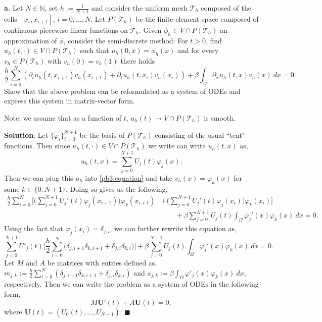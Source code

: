 \documentclass[11pt]{article}
\begin{document}
\textbf{a.} Let $N\in \mathbb{N}$, set $h := \frac{1}{N+1}$ and consider the uniform mesh $\mathcal{T}_h$ composed of the cells $[x_i,x_{i+1}]$, $i= 0,\ldots,N$.
Let $P(\mathcal{T}_h)$ be the finite element space composed of continuous piecewise linear functions on $\mathcal{T}_h$.
Given $\phi_h \in V \cap P(\mathcal{T}_h)$ an approximation of $\phi$, consider the semi-discrete method: For $t >0$, find $u_h(t, \cdot) \in V \cap P(\mathcal{T}_h)$ such that $u_h(0,x) = \phi_h(x)$ and for every $v_h \in  P(\mathcal{T}_h)$ with $v_h(0) = v_h(1)$ there holds 
\begin{equation} \label{pb3:equation}
    \frac{h}{2} \sum_{i=0}^N (\partial_t u_h (t, x_{i+1}) v_h(x_{i+1}) + \partial_t u_h(t, x_i) v_h(x_i)) + \beta \int_\Omega \partial_x u_h(t,x) v_h(x) \: dx = 0.
\end{equation}
Show that the above problem can be reformulated as a system of ODEs and express this system in matrix-vector form. 

Note: we assume that as a function of $t$, $u_h(t) \to V \cap P(\mathcal{T}_h)$ is smooth.

\vskip 1cm

\textbf{Solution}: Let $\{\varphi_i\}_{i=0}^{N+1}$ be the basis of $P(\mathcal{T}_h)$ consisting of the usual ``tent" functions.
Then since $u_h(t,\cdot) \in V \cap P(\mathcal{T}_h)$ we write can write $u_h(t,x)$ as,
\begin{equation}
    u_h(t,x) = \sum_{j=0}^{N+1} U_j(t) \varphi_j(x).
\end{equation}
Then we can plug this $u_h$ into \eqref{pb3:equation} and take $v_h(x) = \varphi_k(x)$ for some $k \in \{0:N+1\}$.
Doing so gives us the following,
\begin{equation}
\begin{split}
    \frac{h}{2} \sum_{i=0}^N \Bigg[ \Big(\sum_{j=0}^{N+1} U_j'(t) \varphi_j(x_{i+1}) \Big) \varphi_k(x_{i+1}) &+ \Big(\sum_{j=0}^{N+1} U_j'(t)  \varphi_j(x_i) \Big) \varphi_k(x_i) \Bigg] \\
    &\qquad + \beta \sum_{j=0}^{N+1} U_j(t) \int_\Omega \varphi_j'(x) \varphi_k(x) \: dx = 0.
\end{split}
\end{equation}
Using the fact that $\varphi_j(x_i) = \delta_{j,i}$, we can further rewrite this equation as,
\begin{equation}
    \sum_{j=0}^{N+1} U'_j(t) \Big[ \frac{h}{2} \sum_{i=0}^N  \big( \delta_{j,i+1} \delta_{k,i+1} + \delta_{j,i} \delta_{k,i} \big) \Big] + \beta \sum_{j=0}^{N+1} U_j(t) \int_\Omega \varphi_j'(x) \varphi_k(x) \: dx = 0. 
\end{equation}
Let $M$ and $A$ be matrices with entries defined as, $m_{j,k} := \tfrac{h}{2} \sum_{i=0}^N (\delta_{j,i+1} \delta_{k,i+1} + \delta_{j,i} \delta_{k,i})$
and $a_{j,k} := \beta \int_{\Omega} \varphi'_j(x) \varphi_k(x) \: dx$, respectively.
Then we can write the problem as a system of ODEs in the following form,
\begin{equation}
    M\mathbf{U}'(t) + A\mathbf{U}(t) = 0,
\end{equation}
where $\mathbf{U}(t) = (U_0(t), \ldots, U_{N+1})$.
$\blacksquare$
\end{document}
